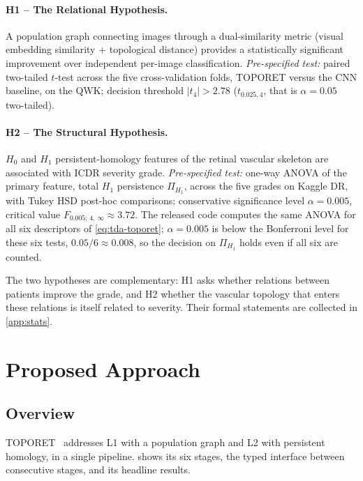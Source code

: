 \paragraph{H1 -- The Relational Hypothesis.}
A population graph connecting images through a dual-similarity metric (visual
embedding similarity $+$ topological distance) provides a statistically significant
improvement over independent per-image classification.
\emph{Pre-specified test:} paired two-tailed $t$-test across the five cross-validation folds, TOPORET
versus the CNN baseline, on the QWK; decision threshold $|t_4| > 2.78$
($t_{0.025,4}$, that is $\alpha=0.05$ two-tailed).

\paragraph{H2 -- The Structural Hypothesis.}
$H_0$ and $H_1$ persistent-homology features of the retinal vascular skeleton are
associated with ICDR severity grade.
\emph{Pre-specified test:} one-way ANOVA of the primary feature, total $H_1$ persistence
$\Pi_{H_1}$, across the five grades on Kaggle DR, with Tukey HSD post-hoc comparisons;
conservative significance level $\alpha=0.005$, critical value $F_{0.005;\,4,\,\infty}
\approx 3.72$. The released code computes the same ANOVA for all six descriptors of
\cref{eq:tda-toporet}; $\alpha=0.005$ is below the Bonferroni level for these six tests,
$0.05/6\approx0.008$, so the decision on $\Pi_{H_1}$ holds even if all six are counted.

The two hypotheses are complementary: H1 asks whether relations between patients improve
the grade, and H2 whether the vascular topology that enters these relations is itself
related to severity. Their formal statements are collected in \cref{app:stats}.

\section{Proposed Approach}
\label{sec:ch3-approach}

\subsection{Overview}
\label{sec:ch3-overview}

TOPORET~\cite{belhadj2025plos} addresses L1 with a population graph and L2 with
persistent homology, in a single pipeline.  shows its six stages, the
typed interface between consecutive stages, and its headline results.

